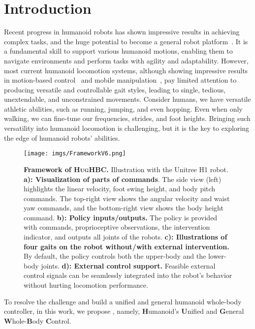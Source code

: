\section{Introduction}
Recent progress in humanoid robots has shown impressive results in achieving complex tasks, and the huge potential to become a general robot platform~\citep{cheng2024tv, zhang2024wococo, cheng2024expressive, scironot2024humanoid}. It is a fundamental skill to support various humanoid motions, enabling them to navigate environments and perform tasks with agility and adaptability.
However, most current humanoid locomotion systems, although showing impressive results in motion-based control~\citep{he2024hover,2024exbody2,fu2024humanplus,cheng2024expressive} and mobile manipulation~\citep{lu2024pmp}, pay limited attention to producing versatile and controllable gait styles, leading to single, tedious, unextendable, and unconstrained movements.
Consider humans, we have versatile athletic abilities, such as running, jumping, and even hopping. Even when only walking, we can fine-tune our frequencies, strides, and foot heights. Bringing such versatility into humanoid locomotion is challenging, but it is the key to exploring the edge of humanoid robots' abilities.
\begin{figure*}[htbp]
\centering
\texttt{[image: imgs/FrameworkV6.png]}
\vspace{-10pt}
\caption{\small \textbf{Framework of \textsc{HugHBC}.} Illustration with the Unitree H1 robot. \textbf{a): Visualization of parts of commands}. The side view (left) highlights the linear velocity, foot swing height, and body pitch commands. The top-right view shows the angular velocity and waist yaw commands, and the bottom-right view shows the body height command. \textbf{b): Policy inputs/outputs.} The policy is provided with commands, proprioceptive observations, the intervention indicator, and outputs all joints of the robots. \textbf{c): Illustrations of four gaits on the robot without/with external intervention.} By default, the policy controls both the upper-body and the lower-body joints. \textbf{d): External control support.} Feasible external control signals can be seamlessly integrated into the robot's behavior without hurting locomotion performance.}
\label{fig:framework}
\vspace{-20pt}
\end{figure*}
To resolve the challenge and build a unified and general humanoid whole-body controller, in this work, we propose \our, namely, \textbf{H}umanoid's \textbf{U}nified and \textbf{G}eneral \textbf{W}hole-\textbf{B}ody \textbf{C}ontrol.
